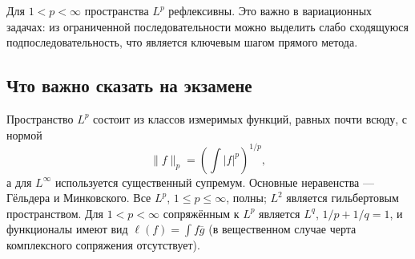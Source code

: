 Для $1<p<\infty$ пространства $L^p$ рефлексивны. Это важно в вариационных задачах:
из ограниченной последовательности можно выделить слабо сходящуюся подпоследовательность,
что является ключевым шагом прямого метода.

\subsection{Что важно сказать на экзамене}

Пространство $L^p$ состоит из классов измеримых функций, равных почти всюду,
с нормой
\[
    \|f\|_p=\left(\int|f|^p\right)^{1/p},
\]
а для $L^\infty$ используется существенный супремум. Основные неравенства ---
Гёльдера и Минковского. Все $L^p$, $1\leq p\leq\infty$, полны; $L^2$ является
гильбертовым пространством. Для $1<p<\infty$ сопряжённым к $L^p$ является
$L^q$, $1/p+1/q=1$, и функционалы имеют вид
$\ell(f)=\int f\overline g$ (в вещественном случае черта комплексного сопряжения отсутствует).

\newpage
